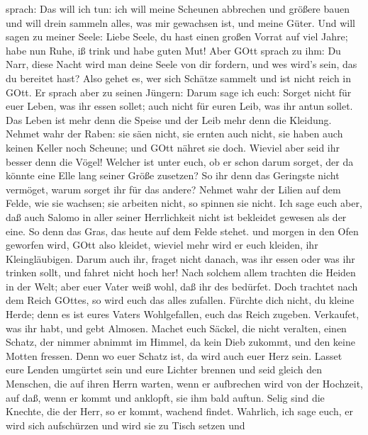 sprach: Das will ich tun: ich will meine Scheunen abbrechen und größere
bauen und will drein sammeln alles, was mir gewachsen ist, und meine
Güter.  Und will sagen zu meiner Seele: Liebe Seele, du
hast einen großen Vorrat auf viel Jahre; habe nun Ruhe, iß trink und
habe guten Mut!  Aber GOtt sprach zu ihm: Du Narr, diese
Nacht wird man deine Seele von dir fordern, und wes wird's sein, das du
bereitet hast?  Also gehet es, wer sich Schätze sammelt und
ist nicht reich in GOtt.  Er sprach aber zu seinen Jüngern:
Darum sage ich euch: Sorget nicht für euer Leben, was ihr essen sollet;
auch nicht für euren Leib, was ihr antun sollet.  Das Leben
ist mehr denn die Speise und der Leib mehr denn die Kleidung.
 Nehmet wahr der Raben: sie säen nicht, sie ernten auch
nicht, sie haben auch keinen Keller noch Scheune; und GOtt nähret sie
doch. Wieviel aber seid ihr besser denn die Vögel!  Welcher
ist unter euch, ob er schon darum sorget, der da könnte eine Elle lang
seiner Größe zusetzen?  So ihr denn das Geringste nicht
vermöget, warum sorget ihr für das andere?  Nehmet wahr der
Lilien auf dem Felde, wie sie wachsen; sie arbeiten nicht, so spinnen
sie nicht. Ich sage euch aber, daß auch Salomo in aller seiner
Herrlichkeit nicht ist bekleidet gewesen als der eine.  So
denn das Gras, das heute auf dem Felde stehet. und morgen in den Ofen
geworfen wird, GOtt also kleidet, wieviel mehr wird er euch kleiden, ihr
Kleingläubigen.  Darum auch ihr, fraget nicht danach, was
ihr essen oder was ihr trinken sollt, und fahret nicht hoch her!
 Nach solchem allem trachten die Heiden in der Welt; aber
euer Vater weiß wohl, daß ihr des bedürfet.  Doch trachtet
nach dem Reich GOttes, so wird euch das alles zufallen. 
Fürchte dich nicht, du kleine Herde; denn es ist eures Vaters
Wohlgefallen, euch das Reich zugeben.  Verkaufet, was ihr
habt, und gebt Almosen. Machet euch Säckel, die nicht veralten, einen
Schatz, der nimmer abnimmt im Himmel, da kein Dieb zukommt, und den
keine Motten fressen.  Denn wo euer Schatz ist, da wird
auch euer Herz sein.  Lasset eure Lenden umgürtet sein und
eure Lichter brennen  und seid gleich den Menschen, die auf
ihren Herrn warten, wenn er aufbrechen wird von der Hochzeit, auf daß,
wenn er kommt und anklopft, sie ihm bald auftun.  Selig
sind die Knechte, die der Herr, so er kommt, wachend findet. Wahrlich,
ich sage euch, er wird sich aufschürzen und wird sie zu Tisch setzen und
